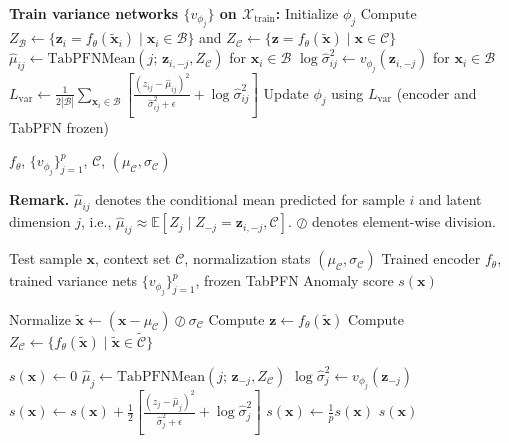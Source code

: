 \documentclass[conference]{IEEEtran}
\begin{document}
\begin{algorithm}[t]
\begin{algorithmic}[1]
			\vspace{2pt}
			\State \textbf{Train variance networks $\{v_{\phi_j}\}$ on $\mathcal{X}_{\mathrm{train}}$:}
			\State Initialize $\phi_j$
			\State Compute $Z_{\mathcal{B}}\gets\{\mathbf{z}_i=f_\theta(\tilde{\mathbf{x}}_i)\mid \mathbf{x}_i\in\mathcal{B}\}$ and $Z_{\mathcal{C}}\gets\{\mathbf{z}=f_\theta(\tilde{\mathbf{x}})\mid \mathbf{x}\in\mathcal{C}\}$
			\State $\hat{\mu}_{ij} \gets \mathrm{TabPFNMean}(j;\, \mathbf{z}_{i,-j}, Z_{\mathcal{C}})$ for $\mathbf{x}_i\in\mathcal{B}$
			\State $\log \hat{\sigma}^2_{ij} \gets v_{\phi_j}(\mathbf{z}_{i,-j})$ for $\mathbf{x}_i\in\mathcal{B}$
			\State $L_{\mathrm{var}} \gets \frac{1}{2|\mathcal{B}|}\sum_{\mathbf{x}_i\in\mathcal{B}}
			\left[\frac{(z_{ij}-\hat{\mu}_{ij})^2}{\hat{\sigma}^2_{ij}+\epsilon} + \log \hat{\sigma}^2_{ij}\right]$
			\State Update $\phi_j$ using $L_{\mathrm{var}}$ (encoder and TabPFN frozen)
			\EndFor
			\EndFor
			\EndFor

			\State \Return $f_\theta$, $\{v_{\phi_j}\}_{j=1}^p$, $\mathcal{C}$, $(\mu_{\mathcal{C}},\sigma_{\mathcal{C}})$
		\end{algorithmic}
	\end{algorithm}
	\noindent\textbf{Remark.} $\hat{\mu}_{ij}$ denotes the conditional mean predicted for sample $i$ and latent dimension $j$, i.e., $\hat{\mu}_{ij}\approx\mathbb{E}[Z_j\mid Z_{-j}=\mathbf{z}_{i,-j},\mathcal{C}]$. $\oslash$ denotes element-wise division.

	\begin{algorithm}[t]
		\caption{Inference with uLEAD-TabPFN}
		\label{alg:infer_ulead}
		\begin{algorithmic}[1]
			\Require Test sample $\mathbf{x}$, context set $\mathcal{C}$, normalization stats $(\mu_{\mathcal{C}},\sigma_{\mathcal{C}})$
			\Require Trained encoder $f_\theta$, trained variance nets $\{v_{\phi_j}\}_{j=1}^p$, frozen TabPFN
			\Ensure Anomaly score $s(\mathbf{x})$

			\State Normalize $\tilde{\mathbf{x}}\gets (\mathbf{x}-\mu_{\mathcal{C}})\oslash\sigma_{\mathcal{C}}$
			\State Compute $\mathbf{z} \gets f_\theta(\tilde{\mathbf{x}})$
			\State Compute $Z_{\mathcal{C}} \gets \{f_\theta(\tilde{\mathbf{x}})\mid \tilde{\mathbf{x}}\in\tilde{\mathcal{C}}\}$

			\State $s(\mathbf{x})\gets 0$
			\State $\hat{\mu}_{j} \gets \mathrm{TabPFNMean}(j;\, \mathbf{z}_{-j}, Z_{\mathcal{C}})$
			\State $\log \hat{\sigma}^2_{j} \gets v_{\phi_j}(\mathbf{z}_{-j})$
			\State $s(\mathbf{x}) \gets s(\mathbf{x}) + \frac{1}{2}\left[\frac{(z_{j}-\hat{\mu}_{j})^2}{\hat{\sigma}^2_{j}+\epsilon}+\log \hat{\sigma}^2_{j}\right]$
			\EndFor
			\State $s(\mathbf{x})\gets \frac{1}{p}s(\mathbf{x})$
			\State \Return $s(\mathbf{x})$
		\end{algorithmic}
	\end{algorithm}
\end{document}
